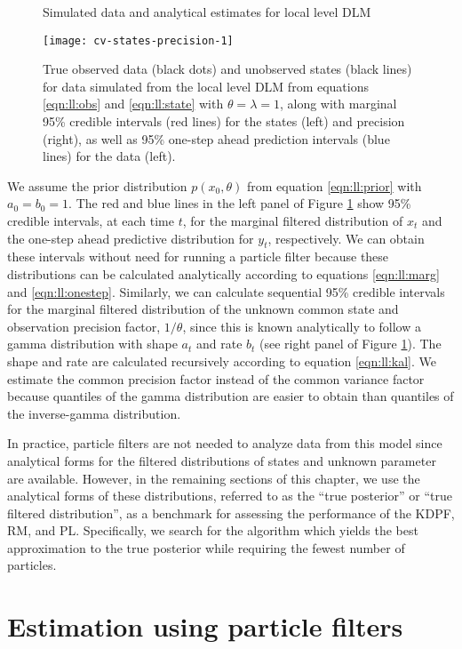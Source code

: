 \begin{figure}[ht]
\ssp
\centering
\caption{Simulated data and analytical estimates for local level DLM} \label{fig:comp:data}
\texttt{[image: cv-states-precision-1]}
\caption*{True observed data (black dots) and unobserved states (black lines) for data simulated from the local level DLM from equations \eqref{eqn:ll:obs} and \eqref{eqn:ll:state} with $\theta = \lambda = 1$, along with marginal 95\% credible intervals (red lines) for the states (left) and precision (right), as well as 95\% one-step ahead prediction intervals (blue lines) for the data (left).}
\end{figure}

We assume the prior distribution $p(x_0,\theta)$ from equation \eqref{eqn:ll:prior} with $a_0 = b_0 = 1$. The red and blue lines in the left panel of Figure \ref{fig:comp:data} show 95\% credible intervals, at each time $t$, for the marginal filtered distribution of $x_t$ and the one-step ahead predictive distribution for $y_t$, respectively. We can obtain these intervals without need for running a particle filter because these distributions can be calculated analytically according to equations \eqref{eqn:ll:marg} and \eqref{eqn:ll:onestep}. Similarly, we can calculate sequential 95\% credible intervals for the marginal filtered distribution of the unknown common state and observation precision factor, $1/\theta$, since this is known analytically to follow a gamma distribution with shape $a_t$ and rate $b_t$  (see right panel of Figure \ref{fig:comp:data}). The shape and rate are calculated recursively according to equation \eqref{eqn:ll:kal}. We estimate the common precision factor instead of the common variance factor because quantiles of the gamma distribution are easier to obtain than quantiles of the inverse-gamma distribution.

In practice, particle filters are not needed to analyze data from this model since analytical forms for the filtered distributions of states and unknown parameter are available. However, in the remaining sections of this chapter, we use the analytical forms of these distributions, referred to as the ``true posterior'' or ``true filtered distribution'', as a benchmark for assessing the performance of the KDPF, RM, and PL. Specifically, we search for the algorithm which yields the best approximation to the true posterior while requiring the fewest number of particles.

\section{Estimation using particle filters} \label{sec:comp:est}

